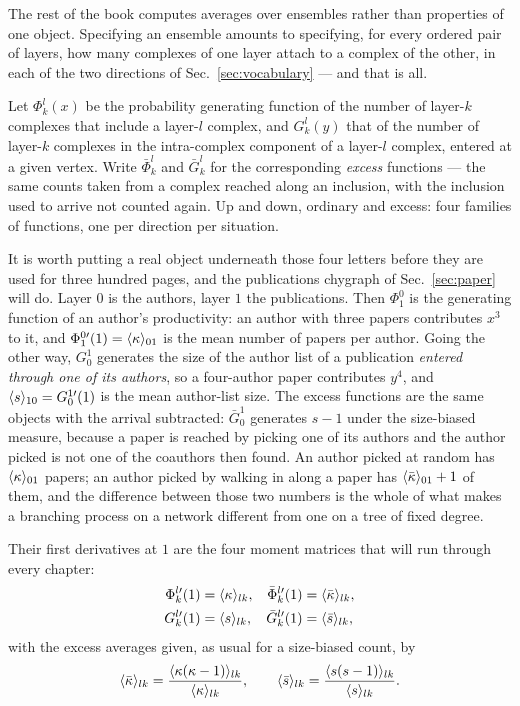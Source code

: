 The rest of the book computes averages over ensembles rather than properties of
one object. Specifying an ensemble amounts
to specifying, for every ordered pair of layers, how many complexes of one layer
attach to a complex of the other, in each of the two directions of
Sec.~\ref{sec:vocabulary} --- and that is all.

Let $\Phi^l_k(x)$ be the probability generating function of the number of
layer-$k$ complexes that include a layer-$l$ complex, and $G^l_k(y)$ that of the
number of layer-$k$ complexes in the intra-complex component of a layer-$l$
complex, entered at a given vertex. Write $\bar\Phi^l_k$ and $\bar G^l_k$ for
the corresponding \emph{excess} functions --- the same counts taken from a
complex reached along an inclusion, with the inclusion used to arrive not
counted again. Up and down, ordinary and excess: four families of functions, one
per direction per situation.

It is worth putting a real object underneath those four letters before they are
used for three hundred pages, and the publications chygraph of
Sec.~\ref{sec:paper} will do. Layer $0$ is the authors, layer $1$ the
publications. Then $\Phi^{0}_{1}$ is the generating function of an author's
productivity: an author with three papers contributes $x^{3}$ to it, and
$\Phi^{0\prime}_{1}(1)=\langle \kappa \rangle_{01}$ is the mean number of papers per
author. Going the other way, $G^{1}_{0}$ generates the size of the author list
of a publication \emph{entered through one of its authors}, so a four-author
paper contributes $y^{4}$, and $\langle s \rangle_{10}=G^{1\prime}_{0}(1)$ is the mean
author-list size. The excess functions are the same objects with the arrival
subtracted: $\bar G^{1}_{0}$ generates $s-1$ under the size-biased measure,
because a paper is reached by picking one of its authors and the author picked
is not one of the coauthors then found. An author picked at random has
$\langle \kappa \rangle_{01}$ papers; an author picked by walking in along a paper has
$\langle \bar\kappa \rangle_{01}+1$ of them, and the difference between those two numbers is
the whole of what makes a branching process on a network different from one on a
tree of fixed degree.

Their first derivatives at $1$ are the four moment matrices that will run
through every chapter:
\begin{align}
  \Phi^{l\prime}_k(1)&=\langle \kappa \rangle_{lk}, &
  \bar\Phi^{l\prime}_k(1)&=\langle \bar\kappa \rangle_{lk},\nonumber\\
  G^{l\prime}_k(1)&=\langle s \rangle_{lk}, &
  \bar G^{l\prime}_k(1)&=\langle \bar s \rangle_{lk},
  \label{eq:moments}
\end{align}
with the excess averages given, as usual for a size-biased count, by
\begin{equation}
  \langle \bar\kappa \rangle_{lk}=\frac{\langle \kappa(\kappa-1) \rangle_{lk}}{\langle \kappa \rangle_{lk}},
  \qquad
  \langle \bar s \rangle_{lk}=\frac{\langle s(s-1) \rangle_{lk}}{\langle s \rangle_{lk}}.
  \label{eq:excess}
\end{equation}

